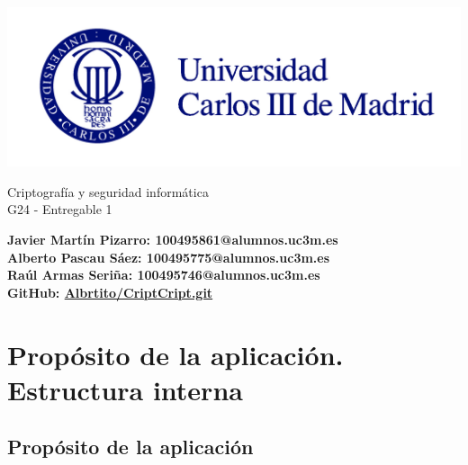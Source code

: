 \documentclass[a4paper,11pt]{article}
\begin{document}
\begin{titlepage}
    \begin{center}
        \vspace*{1cm} 
        \includegraphics[width=1\textwidth]{./uc3m.jpg}
        
        \vspace*{3cm} 
        
        {\LARGE Criptografía y seguridad informática\\[0.5cm]} 
        {\LARGE G24 - Entregable 1 \\[0.5cm]}
        
        \vspace*{6cm}
        
        \textbf{Javier Martín Pizarro: 100495861@alumnos.uc3m.es} \\[0.5cm]
        \textbf{Alberto Pascau Sáez: 100495775@alumnos.uc3m.es} \\[0.5cm]
        \textbf{Raúl Armas Seriña: 100495746@alumnos.uc3m.es} \\[0.5cm]
        
        \vspace*{3cm}
        \textbf{GitHub:
        \href{https://github.com/Albrtito/CriptCript.git}{Albrtito/CriptCript.git}}\\[0.5cm]

    \end{center}
\end{titlepage}

\tableofcontents
\vspace{2cm}


\section{Propósito de la aplicación. Estructura interna}

\subsection{Propósito de la aplicación}
\end{document}
